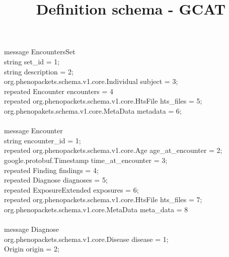 \documentclass[a4paper, 10pt]{article}
\title{Definition schema - GCAT}
\begin{document}
\date{}
\maketitle








message \colorbox{yellow!80}{EncountersSet} \ {  \\
    string set\_id = 1;\\
    string description = 2;\\
    org.phenopackets.schema.v1.core.Individual subject = 3;\\
    repeated \colorbox{yellow!80}{Encounter} encounters = 4 \\
    repeated org.phenopackets.schema.v1.core.HtsFile hts\_files = 5; \\
    org.phenopakets.schema.v1.core.MetaData metadata = 6; \\

\ } \\
 



message \colorbox{yellow!80}{Encounter} \ { \\ 
    string encounter\_id = 1; \\
    repeated org.phenopackets.schema.v1.core.Age age\_at\_encounter = 2; \\
    google.protobuf.Timestamp time\_at\_encounter = 3; \\
    repeated \colorbox{yellow!80}{Finding} findings = 4; \\
    repeated \colorbox{yellow!80}{Diagnose} diagnoses = 5; \\
    repeated \colorbox{yellow!80}{ExposureExtended} exposures = 6; \\
    repeated org.phenopackets.schema.v1.core.HtsFile hts\_files = 7; \\
    org.phenopackets.schema.v1.core.MetaData meta\_data = 8 \\
\ } \\







message \colorbox{yellow!80}{Diagnose} \ { \\   
    org.phenopackets.schema.v1.core.Disease disease = 1; \\
    \colorbox{yellow!80}{Origin} origin = 2;
\ } \\
\end{document}
